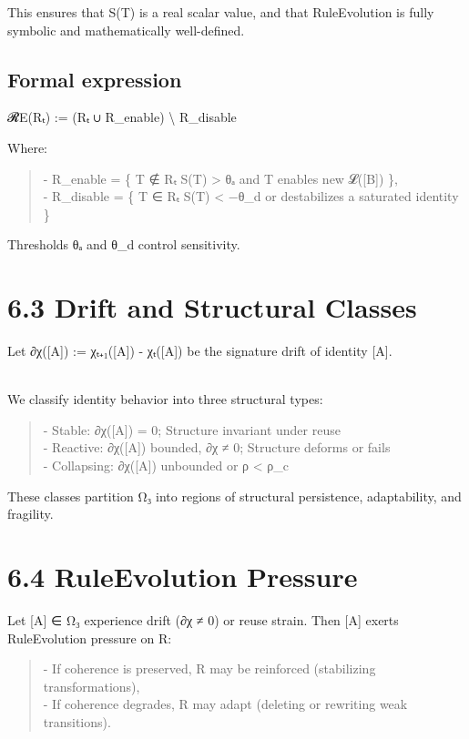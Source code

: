 This ensures that S(T) is a real scalar value, and that RuleEvolution is
fully symbolic and mathematically well-defined.

\subsection{Formal expression}\label{formal-expression}

𝓡E(Rₜ) := (Rₜ ∪ R\_enable) \textbackslash{} R\_disable

Where:

\begin{quote}
- R\_enable = \{ T ∉ Rₜ \textbar{} S(T) \textgreater{} θₐ and T enables
new 𝓛({[}B{]}) \},\\
- R\_disable = \{ T ∈ Rₜ \textbar{} S(T) \textless{} −θ\_d or
destabilizes a saturated identity \}
\end{quote}

Thresholds θₐ and θ\_d control sensitivity.

\section{6.3 \textbar{} Drift and Structural
Classes}\label{drift-and-structural-classes}

Let ∂χ({[}A{]}) := χₜ₊₁({[}A{]}) - χₜ({[}A{]}) be the signature drift of
identity {[}A{]}.\\
\strut \\
We classify identity behavior into three structural types:

\begin{quote}
- Stable: ∂χ({[}A{]}) = 0; Structure invariant under reuse\\
- Reactive: ∂χ({[}A{]}) bounded, ∂χ ≠ 0; Structure deforms or fails\\
- Collapsing: ∂χ({[}A{]}) unbounded or ρ \textless{} ρ\_c
\end{quote}

These classes partition Ω₃ into regions of structural persistence,
adaptability, and fragility.

\section{6.4 \textbar{} RuleEvolution
Pressure}\label{ruleevolution-pressure}

Let {[}A{]} ∈ Ω₃ experience drift (∂χ ≠ 0) or reuse strain. Then {[}A{]}
exerts RuleEvolution pressure on R:

\begin{quote}
- If coherence is preserved, R may be reinforced (stabilizing
transformations),\\
- If coherence degrades, R may adapt (deleting or rewriting weak
transitions).
\end{quote}

